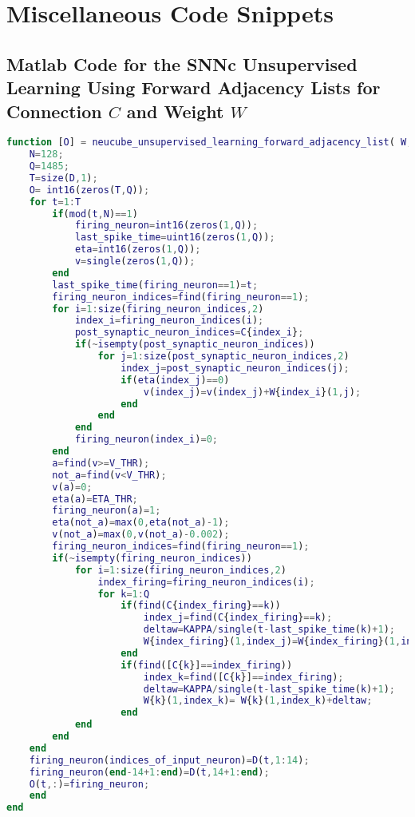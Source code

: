 
\chapter{Miscellaneous Code Snippets}

\label{chap:app_SNNc_unsupervised}

\section{Matlab Code for the SNNc Unsupervised Learning Using Forward Adjacency Lists for Connection \texorpdfstring{$C$}{Lg} and Weight \texorpdfstring{$W$}{Lg}}

\begin{lstlisting}[language=Matlab,caption={Matlab code for SNNc unsupervised learning algorithm using forward adjacency list data structure for storing connection C and weight W}]
function [O] = neucube_unsupervised_learning_forward_adjacency_list( W,C,D,indices_of_input_neuron, V_THR, ETA_THR, KAPPA)
	N=128;
	Q=1485;
	T=size(D,1);
	O= int16(zeros(T,Q));
	for t=1:T
		if(mod(t,N)==1)
			firing_neuron=int16(zeros(1,Q));
			last_spike_time=uint16(zeros(1,Q));
			eta=int16(zeros(1,Q));
			v=single(zeros(1,Q));
		end
		last_spike_time(firing_neuron==1)=t;
		firing_neuron_indices=find(firing_neuron==1);
		for i=1:size(firing_neuron_indices,2)
			index_i=firing_neuron_indices(i);
			post_synaptic_neuron_indices=C{index_i};
			if(~isempty(post_synaptic_neuron_indices))
				for j=1:size(post_synaptic_neuron_indices,2)
					index_j=post_synaptic_neuron_indices(j); 
					if(eta(index_j)==0)                
						v(index_j)=v(index_j)+W{index_i}(1,j);
					end               
				end            
			end
			firing_neuron(index_i)=0;        
		end
		a=find(v>=V_THR);
		not_a=find(v<V_THR);
		v(a)=0;
		eta(a)=ETA_THR;
		firing_neuron(a)=1;
		eta(not_a)=max(0,eta(not_a)-1);
		v(not_a)=max(0,v(not_a)-0.002);  
		firing_neuron_indices=find(firing_neuron==1);
		if(~isempty(firing_neuron_indices))
			for i=1:size(firing_neuron_indices,2)
				index_firing=firing_neuron_indices(i);                  
				for k=1:Q              
					if(find(C{index_firing}==k))
						index_j=find(C{index_firing}==k);
						deltaw=KAPPA/single(t-last_spike_time(k)+1);
						W{index_firing}(1,index_j)=W{index_firing}(1,index_j)-deltaw; 
					end
					if(find([C{k}]==index_firing))
						index_k=find([C{k}]==index_firing);
						deltaw=KAPPA/single(t-last_spike_time(k)+1);
						W{k}(1,index_k)= W{k}(1,index_k)+deltaw;                    
					end
			end
		end
	end
	firing_neuron(indices_of_input_neuron)=D(t,1:14);
	firing_neuron(end-14+1:end)=D(t,14+1:end);
	O(t,:)=firing_neuron;
	end
end



\end{lstlisting}
